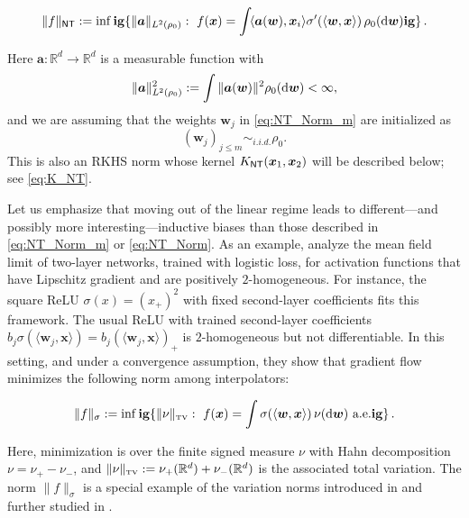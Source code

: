 \begin{align}
  \|f\|_{{\sf NT}}:= \inf\mathbf{ig}\{\|{\boldsymbol a}\|_{L^2(\rho_0)}:~ f({\boldsymbol x})=\int \!\langle{\boldsymbol a}({\boldsymbol w}),{\boldsymbol x}_i\rangle\sigma'(\langle{\boldsymbol w},{\boldsymbol x}\rangle)\, \rho_0({\rm d}{\boldsymbol w})\mathbf{ig}\}\, .
  \label{eq:NT_Norm}
\end{align}

Here ${\boldsymbol a}:{\mathbb R}^d\to{\mathbb R}^d$ is a measurable function with
  \[
    \|{\boldsymbol a}\|_{L^2(\rho_0)}^2 := \int \|{\boldsymbol a}({\boldsymbol w})\|^2\rho_0({\rm d} {\boldsymbol w})<\infty,
  \]
and we are assuming that the weights ${\boldsymbol w}_j$ in \eqref{eq:NT_Norm_m}
are initialized as
$$({\boldsymbol w}_j)_{j\le m}\sim_{i.i.d.}\rho_0.
$$
This is also an RKHS norm whose kernel $K_{{\sf NT}}({\boldsymbol x}_1,{\boldsymbol x}_2)$ will be described below; see \eqref{eq:K_NT}.

Let us emphasize that moving out of the linear regime leads to different---and possibly more interesting---inductive biases than those described in \eqref{eq:NT_Norm_m} or \eqref{eq:NT_Norm}.
As an example, \cite{chizat2020implicit} analyze the mean field limit of two-layer networks, trained with logistic loss, for activation functions that have Lipschitz gradient and are positively $2$-homogeneous. For instance, the square ReLU
$\sigma(x) = (x_+)^2$ with fixed second-layer coefficients  fits this framework. The usual ReLU with trained second-layer coefficients
$b_j\sigma(\langle{\boldsymbol w}_j,{\boldsymbol x}\rangle)= b_j(\langle{\boldsymbol w}_j,{\boldsymbol x}\rangle)_+$ is $2$-homogeneous but not differentiable. In this setting, and under a convergence assumption, they show that gradient flow minimizes the following norm among interpolators:

\begin{align}
  \|f\|_{\sigma}:= \inf\mathbf{ig}\{\|\nu\|_{\mbox{\rm\tiny TV}}:~ f({\boldsymbol x})=\int \sigma(\langle{\boldsymbol w},{\boldsymbol x}\rangle)\, \nu({\rm d}{\boldsymbol w}) \mbox{ a.e.}\mathbf{ig}\}\, .
  \label{eq:TV_Norm} 
\end{align}

Here, minimization is over the finite signed measure $\nu$ with Hahn decomposition  $\nu= \nu_+-\nu_-$,
and $\|\nu\|_{\mbox{\rm\tiny TV}}:=\nu_+({\mathbb R}^d)+\nu_-({\mathbb R}^d)$ is the associated total variation. The norm   $\|f\|_{\sigma}$ is a special example of the variation norms introduced in \cite{kurkova1997dimension} and further studied in  \cite{kurkova2001bounds,kurkova2002comparison}. 

